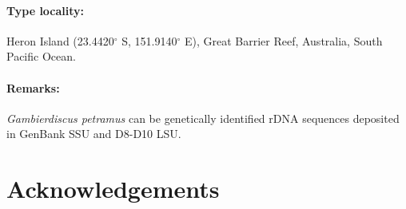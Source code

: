 \documentclass[12pt]{article}
\begin{document}
\paragraph{Type locality:} Heron Island (23.4420$^{\circ}$ S, 151.9140$^{\circ}$ E), Great Barrier Reef, Australia, South Pacific Ocean.
\paragraph{Remarks:} \emph{Gambierdiscus petramus} can be genetically identified rDNA sequences deposited in GenBank SSU and D8-D10 LSU.

\newpage
\section{Acknowledgements}
\end{document}
